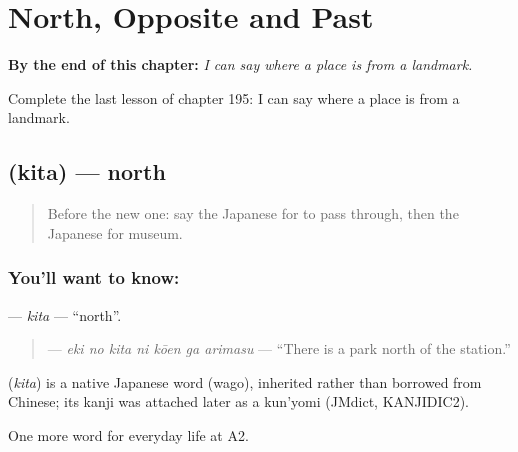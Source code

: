 
\chapter{North, Opposite and Past}
\label{ch:ja-north-opposite-and-past}

\begin{chapteropening}
\textbf{By the end of this chapter:} \emph{I can say where a place is from a landmark.}

Complete the last lesson of chapter 195: I can say where a place is from a landmark.
\end{chapteropening}

\section[\texorpdfstring{\ja{きた} (kita)}{きた (kita)}]{ (kita) — north}

\label{lesson:JA-C195-kita}



\begin{quote}
Before the new one: say the Japanese for to pass through, then the Japanese for museum.
\end{quote}

\subsection*{You'll want to know: }
\textbf{} — \emph{kita} — \textquotedblleft{}north\textquotedblright{}.

\begin{quote}
\textbf{   } — \emph{eki no kita ni kōen ga arimasu} — \textquotedblleft{}There is a park north of the station.\textquotedblright{}
\end{quote}

\begin{cousinweb}
\textbf{} (\emph{kita}) is a native Japanese word (wago), inherited rather than borrowed from Chinese; its kanji was attached later as a kun'yomi (JMdict, KANJIDIC2).
\end{cousinweb}

\begin{grammarlens}[title={What you've built}]
One more word for everyday life at A2.
\end{grammarlens}

